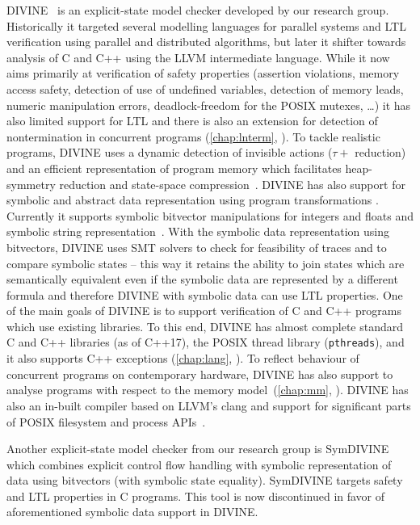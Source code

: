 DIVINE~\cite{DIVINEToolPaper2017} is an explicit-state model checker developed
by our research group.
Historically it targeted several modelling languages for parallel systems and
LTL verification using parallel and distributed algorithms, but later it
shifter towards analysis of C and C++ using the LLVM intermediate language.
While it now aims primarily at verification of safety properties (assertion
violations, memory access safety, detection of use of undefined variables,
detection of memory leads, numeric manipulation errors, deadlock-freedom for
the POSIX mutexes, …) it has also limited support for LTL and there is also an
extension for detection of nontermination in concurrent programs
(\autoref{chap:lnterm}, \cite{SB2019}).
To tackle realistic programs, DIVINE uses a dynamic detection of invisible
actions ($\tau+$ reduction) and an efficient representation of program memory
which facilitates heap-symmetry reduction and state-space
compression~\cite{RSCB2018}.
DIVINE has also support for symbolic and abstract data representation using
program transformations \cite{LRB2018}.
Currently it supports symbolic bitvector manipulations for integers and floats
and symbolic string representation~\cite{CLOR2019}.
With the symbolic data representation using bitvectors, DIVINE uses SMT solvers
to check for feasibility of traces and to compare symbolic states -- this way
it retains the ability to join states which are semantically equivalent even if
the symbolic data are represented by a different formula and therefore DIVINE
with symbolic data can use LTL properties.
One of the main goals of DIVINE is to support verification of C and C++
programs which use existing libraries.
To this end, DIVINE has almost complete standard C and C++ libraries (as of
C++17), the POSIX thread library (\texttt{pthreads}), and it also supports C++
exceptions (\autoref{chap:lang}, \cite{SRB2017}).
To reflect behaviour of concurrent programs on contemporary hardware, DIVINE
has also support to analyse programs with respect to the \xtso memory
model~(\autoref{chap:mm}, \cite{SB2018x86tso}).
DIVINE has also an in-built compiler based on LLVM's clang and support for significant parts of POSIX filesystem and process APIs~\cite{RBMKB2019}.

Another explicit-state model checker from our research group is
\textsf{SymDIVINE}~\cite{MBLB2016} which combines explicit control flow
handling with symbolic representation of data using bitvectors (with symbolic
state equality).
\textsf{SymDIVINE} targets safety and LTL properties in C programs.
This tool is now discontinued in favor of aforementioned symbolic data support
in DIVINE.


